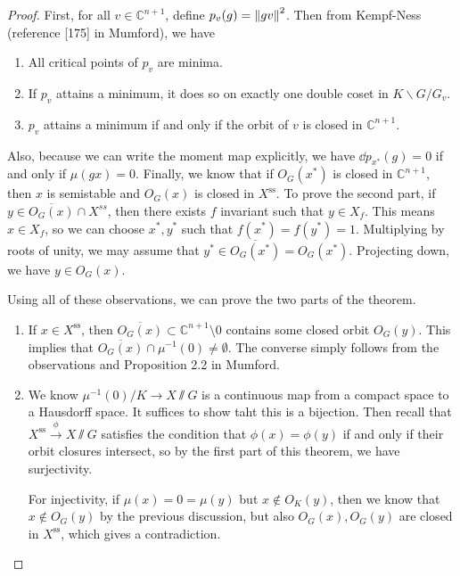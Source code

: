 \documentclass[leqno, openany]{memoir}
\theoremstyle{definition}
\theoremstyle{remark}
\theoremstyle{plain}
\theoremstyle{definition}
\theoremstyle{remark}
\newcommand{\C}{\mathbb{C}}
\newcommand{\mr}[1]{\mathrm{#1}}
\newcommand{\ol}[1]{\overline{#1}}
\begin{document}
\begin{proof} First, for all $v \in \C^{n+1}$, define $p_v(g) = \norm{gv}^2$.
    Then from Kempf-Ness (reference [175] in Mumford), we have
    \begin{enumerate}[label=(\roman*)] \item All critical points of $p_v$ are
        minima.  \item If $p_v$ attains a minimum, it does so on exactly one
        double coset in $K \backslash G / G_v$.  \item $p_v$ attains a minimum
if and only if the orbit of $v$ is closed in $\C^{n+1}$.  \end{enumerate} Also,
because we can write the moment map explicitly, we have $\dd{p}_{x^*}(g) = 0$
if and only if $\mu(gx) = 0$. Finally, we know that if $O_G(x^*)$ is closed in
$\C^{n+1}$, then $x$ is semistable and $O_G(x)$ is closed in $X^{\mr{ss}}$. To
prove the second part, if $y \in \ol{O_G(x)} \cap X^{ss}$, then there exists
$f$ invariant such that $y \in X_f$. This means $x \in X_f$, so we can choose
$x^*, y^*$ such that $f(x^*) = f(y^*) = 1$. Multiplying by roots of unity, we
may assume that $y^* \in \ol{O_G(x^*)} = O_G(x^*)$. Projecting down, we have $y
\in O_G(x)$.

    Using all of these observations, we can prove the two parts of the theorem.
    \begin{enumerate} \item If $x \in X^{\mr{ss}}$, then $\ol{O_G(x)} \subset
        \C^{n+1} \setminus \qty{0}$ contains some closed orbit $O_G(y)$. This
        implies that $\ol{O_G(x)} \cap \mu^{-1}(0) \neq \emptyset$. The
        converse simply follows from the observations and Proposition 2.2 in
        Mumford.  \item We know $\mu^{-1}(0)/K \to X \sslash G$ is a continuous
        map from a compact space to a Hausdorff space. It suffices to show taht
        this is a bijection. Then recall that $X^{\mr{ss}} \xrightarrow{\phi} X
        \sslash G$ satisfies the condition that $\phi(x) = \phi(y)$ if and only
        if their orbit closures intersect, so by the first part of this
        theorem, we have surjectivity.

            For injectivity, if $\mu(x) = 0 = \mu(y)$ but $x \notin O_K(y)$,
    then we know that $x \notin O_G(y)$ by the previous discussion, but also
    $O_G(x), O_G(y)$ are closed in $X^{\mr{ss}}$, which gives a contradiction.
    \qedhere \end{enumerate} \end{proof}
\end{document}
